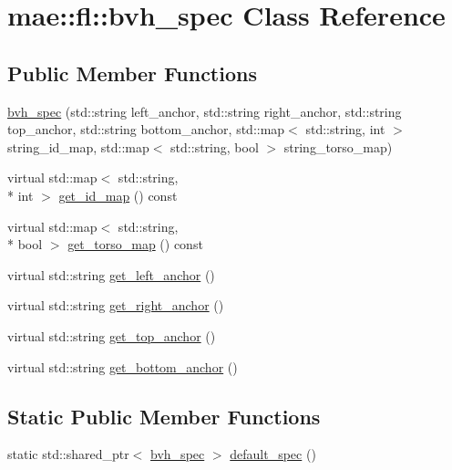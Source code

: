 \hypertarget{classmae_1_1fl_1_1bvh__spec}{\section{mae\-:\-:fl\-:\-:bvh\-\_\-spec Class Reference}
\label{classmae_1_1fl_1_1bvh__spec}
}
\subsection*{Public Member Functions}
\begin{DoxyCompactItemize}
\item 
\hyperlink{classmae_1_1fl_1_1bvh__spec_a9ddaa4a47e11b35a954d3881d2d69aaf}{bvh\-\_\-spec} (std\-::string left\-\_\-anchor, std\-::string right\-\_\-anchor, std\-::string top\-\_\-anchor, std\-::string bottom\-\_\-anchor, std\-::map$<$ std\-::string, int $>$ string\-\_\-id\-\_\-map, std\-::map$<$ std\-::string, bool $>$ string\-\_\-torso\-\_\-map)
\item 
virtual std\-::map$<$ std\-::string, \\*
int $>$ \hyperlink{classmae_1_1fl_1_1bvh__spec_aea992e05503ec167ce7cbaa88504b06d}{get\-\_\-id\-\_\-map} () const 
\item 
virtual std\-::map$<$ std\-::string, \\*
bool $>$ \hyperlink{classmae_1_1fl_1_1bvh__spec_a2673984db6dc06733f5eafb1b8fa7bd6}{get\-\_\-torso\-\_\-map} () const 
\item 
virtual std\-::string \hyperlink{classmae_1_1fl_1_1bvh__spec_affe353bb36edce74bc7e1f6fe12150e8}{get\-\_\-left\-\_\-anchor} ()
\item 
virtual std\-::string \hyperlink{classmae_1_1fl_1_1bvh__spec_a3b18051079ab3ff64186bff1be7a1373}{get\-\_\-right\-\_\-anchor} ()
\item 
virtual std\-::string \hyperlink{classmae_1_1fl_1_1bvh__spec_abac832056f67a071725283d5490f3b89}{get\-\_\-top\-\_\-anchor} ()
\item 
virtual std\-::string \hyperlink{classmae_1_1fl_1_1bvh__spec_af39b51f8bcd88b92c14b694d98eb8aea}{get\-\_\-bottom\-\_\-anchor} ()
\end{DoxyCompactItemize}
\subsection*{Static Public Member Functions}
\begin{DoxyCompactItemize}
\item 
static std\-::shared\-\_\-ptr$<$ \hyperlink{classmae_1_1fl_1_1bvh__spec}{bvh\-\_\-spec} $>$ \hyperlink{classmae_1_1fl_1_1bvh__spec_ad881d9668544d61445801949725a5484}{default\-\_\-spec} ()
\end{DoxyCompactItemize}


